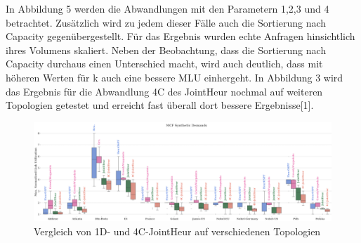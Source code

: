 \documentclass[sigconf,noacm,review]{acmart}
\begin{document}
In Abbildung 5 werden die Abwandlungen mit den Parametern 1,2,3 und 4 betrachtet. Zusätzlich wird zu jedem dieser Fälle auch die Sortierung nach Capacity gegenübergestellt. Für das Ergebnis wurden echte Anfragen hinsichtlich ihres Volumens skaliert. Neben der Beobachtung, dass die Sortierung nach Capacity durchaus einen Unterschied macht, wird auch deutlich, dass mit höheren Werten für k auch eine bessere MLU einhergeht. In Abbildung 3 wird das Ergebnis für die Abwandlung 4C des JointHeur nochmal auf weiteren Topologien getestet und erreicht fast überall dort bessere Ergebnisse[1].
\begin{figure}[h]
  \centering 
  \includegraphics[width=\linewidth]{abbildungen/PNG-Bild 3}
  \caption{Vergleich von 1D- und 4C-JointHeur auf verschiedenen Topologien}
\end{figure}
\end{document}
